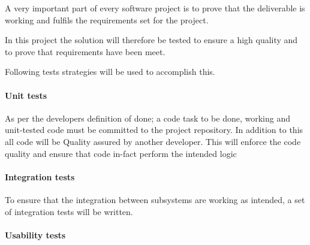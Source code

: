 \documentclass[../report.tex]{subfiles}
\begin{document}
\graphicspath{{img/}{../img/}}

A very important part of every software project is to prove that the deliverable is working and fulfils the requirements set for the project.

In this project the solution will therefore be tested to ensure a high quality and to prove that requirements have been meet.


Following tests strategies will be used to accomplish this.

\paragraph{Unit tests}

As per the developers definition of done; a code task to be done, working and unit-tested code must be committed to the project repository. In addition to this all code will be Quality assured by another developer. This will enforce the code quality and ensure that code in-fact perform the intended logic


\paragraph{Integration tests}

To ensure that the integration between subsystems are working as intended, a set of integration tests will be written.




\paragraph{Usability tests}
\end{document}
